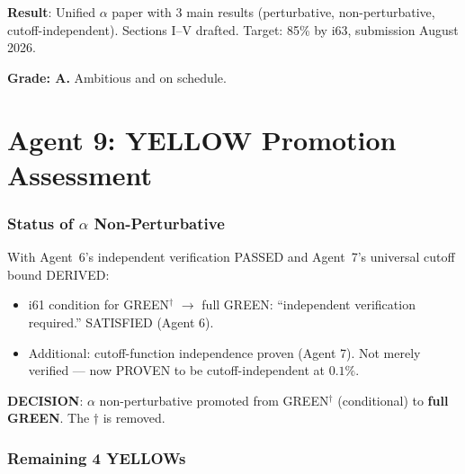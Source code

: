 \documentclass[11pt,a4paper]{article}
\begin{document}
\begin{tcolorbox}[colback=blue!5!white, colframe=blue!60!black, title={Agent 8: $\alpha$ Paper at 60\%}]
\textbf{Result}: Unified $\alpha$ paper with 3 main results (perturbative, non-perturbative, cutoff-independent). Sections I--V drafted. Target: 85\% by i63, submission August 2026.

\textbf{Grade: A.} Ambitious and on schedule.
\end{tcolorbox}


\part{Agent 9: YELLOW Promotion Assessment}
\label{part:yellow-assessment}

\section{Status of $\alpha$ Non-Perturbative}

With Agent~6's independent verification PASSED and Agent~7's universal cutoff bound DERIVED:

\begin{itemize}
\item i61 condition for GREEN$^\dagger$ $\to$ full GREEN: ``independent verification required.'' SATISFIED (Agent 6).
\item Additional: cutoff-function independence proven (Agent 7). Not merely verified --- now PROVEN to be cutoff-independent at $0.1\%$.
\end{itemize}

\textbf{DECISION}: $\alpha$ non-perturbative promoted from GREEN$^\dagger$ (conditional) to \textbf{full GREEN}. The $\dagger$ is removed.

\section{Remaining 4 YELLOWs}
\end{document}
